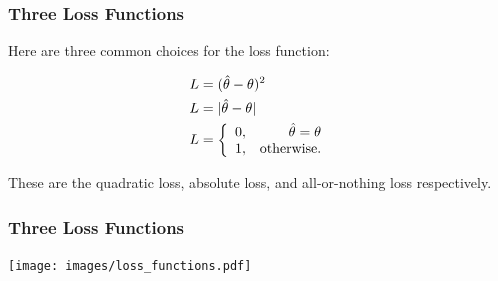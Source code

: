 \documentclass{beamer}
\begin{document}
\begin{frame}
\frametitle{Three Loss Functions}
Here are three common choices for the loss function:

\begin{align}
L &= (\hat{\theta} - \theta)^2 \\
L &= |\hat{\theta} - \theta| \\
L &= \left\{
        \begin{array}{lr}
        0, & \hat{\theta} = \theta \\
        1, & \textnormal{otherwise.}
        \end{array}
        \right.
\end{align}

These are the quadratic loss, absolute loss, and all-or-nothing loss
respectively.
\end{frame}



\begin{frame}
\frametitle{Three Loss Functions}

\centering
\texttt{[image: images/loss\_functions.pdf]}

\end{frame}
\end{document}
